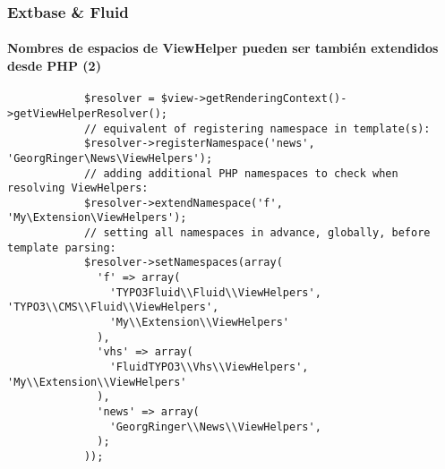 
\begin{frame}[fragile]
	\frametitle{Extbase \& Fluid}
	\framesubtitle{Nombres de espacios de ViewHelper pueden ser también extendidos desde PHP (2)}

	\lstset{basicstyle=\tiny\ttfamily}

		\begin{lstlisting}
			$resolver = $view->getRenderingContext()->getViewHelperResolver();
			// equivalent of registering namespace in template(s):
			$resolver->registerNamespace('news', 'GeorgRinger\News\ViewHelpers');
			// adding additional PHP namespaces to check when resolving ViewHelpers:
			$resolver->extendNamespace('f', 'My\Extension\ViewHelpers');
			// setting all namespaces in advance, globally, before template parsing:
			$resolver->setNamespaces(array(
			  'f' => array(
			    'TYPO3Fluid\\Fluid\\ViewHelpers', 'TYPO3\\CMS\\Fluid\\ViewHelpers',
			    'My\\Extension\\ViewHelpers'
			  ),
			  'vhs' => array(
			    'FluidTYPO3\\Vhs\\ViewHelpers', 'My\\Extension\\ViewHelpers'
			  ),
			  'news' => array(
			    'GeorgRinger\\News\\ViewHelpers',
			  );
			));
		\end{lstlisting}

\end{frame}


